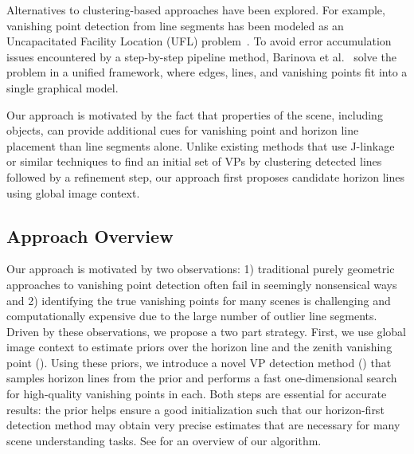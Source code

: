 Alternatives to clustering-based approaches have been explored.
For example, vanishing point detection from line segments has been
modeled as an Uncapacitated Facility Location (UFL)
problem~\cite{global2013, selfsketch2012}. To avoid error accumulation
issues encountered by a step-by-step pipeline method, Barinova et
al.~\cite{geoparser2010} solve the problem in a unified framework,
where edges, lines, and vanishing points fit into a single graphical
model.

Our approach is motivated by the fact that properties of the scene,
including objects, can provide additional cues for vanishing point and
horizon line placement than line segments alone. Unlike existing
methods that use J-linkage~\cite{tardif2009, kitware2013} or similar
techniques to find an initial set of VPs by clustering detected lines
followed by a refinement step, our approach first proposes candidate
horizon lines using global image context.  



%
%
\subsection{Approach Overview}

Our approach is motivated by two observations: 1) traditional purely
geometric approaches to vanishing point detection often fail in
seemingly nonsensical ways and 2) identifying the true vanishing
points for many scenes is challenging and computationally expensive
due to the large number of outlier line segments. Driven by these
observations, we propose a two part strategy.  First, we use global
image context to estimate priors over the horizon line and the zenith
vanishing point (). Using these priors, we
introduce a novel VP detection method () that samples
horizon lines from the prior and performs a fast one-dimensional
search for high-quality vanishing points in each. Both steps are
essential for accurate results: the prior helps ensure a good
initialization such that our horizon-first detection method may obtain
very precise estimates that are necessary for many scene understanding
tasks. See  for an overview of our algorithm.

